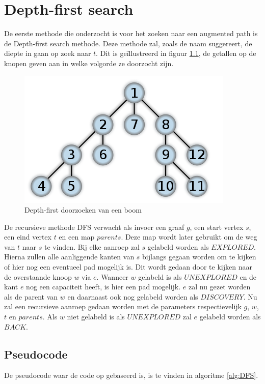 \chapter{Depth-first search}
\label{chap:depthfirst}

De eerste methode die onderzocht is voor het zoeken naar een augmented path is de Depth-first search methode. Deze methode zal, zoals de naam suggereert, de diepte in gaan op zoek naar $t$. Dit is ge\"illustreerd in figuur \ref{fig:depthFirstTree}, de getallen op de knopen geven aan in welke volgorde ze doorzocht zijn.

\begin{figure}[h]
 \centering
 \includegraphics[width=0.5\linewidth]{depthfirst/depthfirsttree}
 \caption{Depth-first doorzoeken van een boom}
 \label{fig:depthFirstTree}
\end{figure}

De recursieve methode DFS verwacht als invoer een graaf $g$, een start vertex $s$, een eind vertex $t$ en een map $parents$. Deze map wordt later gebruikt om de weg van $t$ naar $s$ te vinden. Bij elke aanroep zal $s$ gelabeld worden als $EXPLORED$. Hierna zullen alle aanliggende kanten van $s$ bijlangs gegaan worden om te kijken of hier nog een eventueel pad mogelijk is. Dit wordt gedaan door te kijken naar de overstaande knoop $w$ via $e$. Wanneer $w$ gelabeld is als $UNEXPLORED$ en de kant $e$ nog een capaciteit heeft, is hier een pad mogelijk. $e$ zal nu gezet worden als de parent van $w$ en daarnaast ook nog gelabeld worden als $DISCOVERY$. Nu zal een recursieve aanroep gedaan worden met de parameters respectievelijk $g$, $w$, $t$ en $parents$.
Als $w$ niet gelabeld is als $UNEXPLORED$ zal $e$ gelabeld worden als $BACK$.

\section{Pseudocode}
De pseudocode waar de code op gebaseerd is, is te vinden in algoritme \ref{alg:DFS}.

